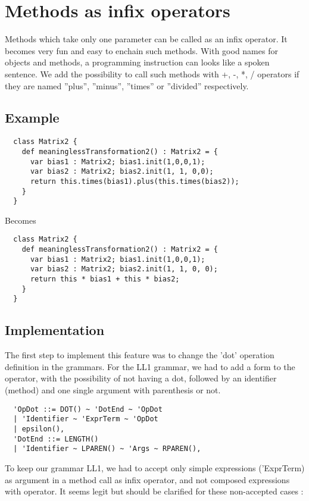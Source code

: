 \section{Methods as infix operators}
\textnormal{ Methods which take only one parameter can be called as an infix
  operator. It becomes very fun and easy to enchain such methods. With good
  names for objects and methods, a programming instruction can looks like a
  spoken sentence. We add the possibility to call such methods with +, -, *,
  / operators if they are named ''plus'', ''minus'', ''times'' or ''divided''
  respectively.}

\subsection{Example}

\begin{lstlisting}
  class Matrix2 {
    def meaninglessTransformation2() : Matrix2 = {
      var bias1 : Matrix2; bias1.init(1,0,0,1);
      var bias2 : Matrix2; bias2.init(1, 1, 0,0);
      return this.times(bias1).plus(this.times(bias2));  
    }
  }
\end{lstlisting}
\textmd{Becomes}
\begin{lstlisting}
  class Matrix2 {
    def meaninglessTransformation2() : Matrix2 = {
      var bias1 : Matrix2; bias1.init(1,0,0,1);
      var bias2 : Matrix2; bias2.init(1, 1, 0, 0);
      return this * bias1 + this * bias2;
    }
  }
\end{lstlisting}
\subsection{Implementation}
\textnormal{ The first step to implement this feature was to change the 'dot'
  operation definition in the grammars. For the LL1 grammar, we had to add a
  form to the operator, with the possibility of not having a dot, followed by an
  identifier (method) and one single argument with parenthesis or not. }

\begin{lstlisting}
  'OpDot ::= DOT() ~ 'DotEnd ~ 'OpDot
  | 'Identifier ~ 'ExprTerm ~ 'OpDot
  | epsilon(),
  'DotEnd ::= LENGTH()
  | 'Identifier ~ LPAREN() ~ 'Args ~ RPAREN(),
\end{lstlisting}

\textnormal{ To keep our grammar LL1, we had to accept only simple expressions
  ('ExprTerm) as argument in a method call as infix operator, and not composed
  expressions with operator. It seems legit but should be clarified for these
  non-accepted cases : }

